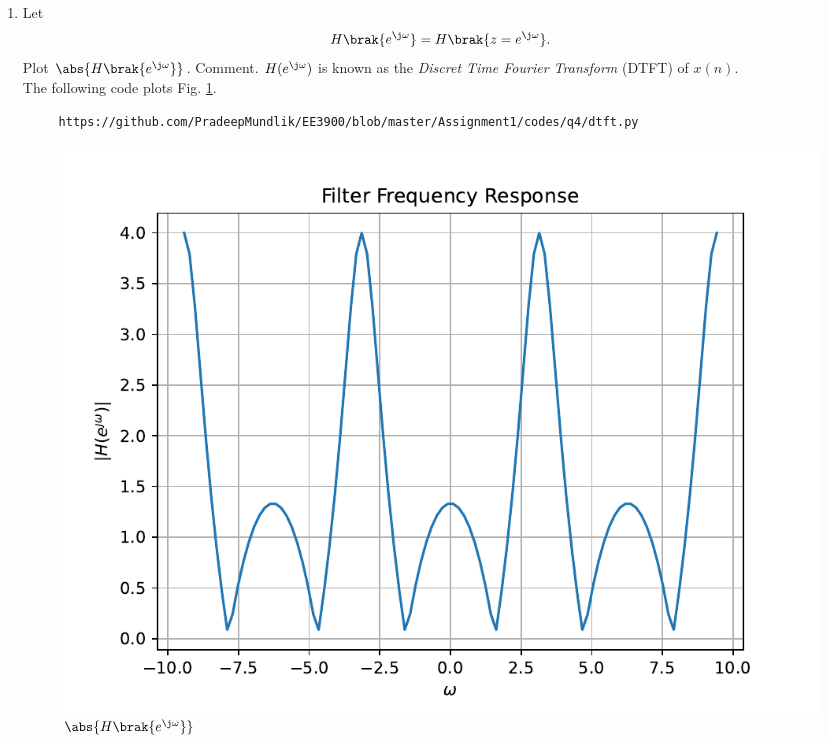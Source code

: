 \documentclass[journal,12pt,twocolumn]{IEEEtran}
\renewcommand\thesection{\arabic{section}}
\begin{document}
\begin{enumerate}[label=\thesection.\arabic*]
%
\item 
Let
\begin{equation}
H\brak{e^{\j \omega}} = H\brak{z = e^{\j \omega}}.
\end{equation}
Plot $\abs{H\brak{e^{\j \omega}}}$.  Comment.  $H(e^{\j \omega})$ is
known as the {\em Discret Time Fourier Transform} (DTFT) of $x(n)$.
\\
\solution The following code plots Fig. \ref{fig:dtft}.
\begin{lstlisting}
     https://github.com/PradeepMundlik/EE3900/blob/master/Assignment1/codes/q4/dtft.py
\end{lstlisting}
\begin{figure}[!ht]
\centering
\includegraphics[width=\columnwidth]{figs/q4/dtft.pdf}
\caption{$\abs{H\brak{e^{\j\omega}}}$}
\label{fig:dtft}
\end{figure}
\end{enumerate}
\end{document}
